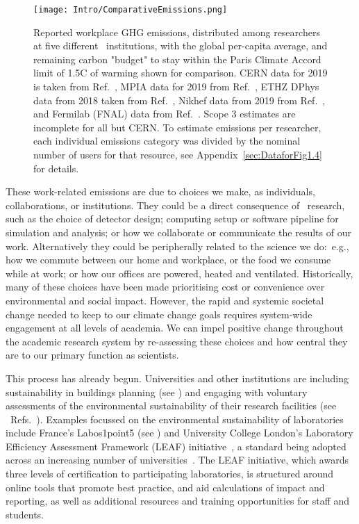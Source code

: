 \documentclass[../SustainableHEP.tex]{subfiles}
\begin{document}
\begin{figure}[!tb]
    \centering
    \texttt{[image: Intro/ComparativeEmissions.png]}
    \caption[Reported workplace GHG emissions for researchers at \ACR\ institutions]{Reported workplace GHG emissions, distributed among researchers at five different \ACR\ institutions, with the global per-capita average, and remaining carbon "budget" to stay within the Paris Climate Accord limit of 1.5\degree C of warming shown for comparison.
    CERN data for 2019 is taken from Ref.~\cite{Environment:2737239,CERN-HR-STAFF-STAT-2019,CERN:2723123,Hartley}, MPIA data for 2019 from Ref.~\cite{Jahnke2020}, ETHZ DPhys data from 2018 taken from Ref.~\cite{Beisert2020}, Nikhef data from 2019 from Ref.~\cite{Nikhef}, and Fermilab (FNAL) data from Ref.~\cite{FermilabEnvReport2019}. Scope 3 estimates are incomplete for all but CERN.  To estimate emissions per researcher, each individual emissions category was divided by the nominal number of users for that resource, see Appendix~\ref{sec:DataforFig1.4} for details.  
    \label{fig:Intro-ComparativeEmissions}}
\end{figure}

These work-related emissions are due to choices we make, as individuals, collaborations, or institutions.  They could be a direct consequence of \ACR\ research, such as the choice of detector design; computing setup or software pipeline for simulation and analysis; or how we collaborate or communicate the results of our work.  Alternatively they could be peripherally related to the science we do:~e.g., how we commute between our home and workplace, or the food we consume while at work; or how our offices are powered, heated and ventilated. 
Historically, many of these choices have been made prioritising cost or convenience over environmental and social impact.  However, the rapid and systemic societal change needed to keep to our climate change goals requires system-wide engagement at all levels of academia.  We can impel positive change throughout the academic research system by re-assessing these choices and how central they are to our primary function as scientists.

This process has already begun. Universities and other institutions are including sustainability in buildings planning (see ) and engaging with voluntary assessments of the environmental sustainability of their research facilities (see \eg~Refs.~\cite{Environment:2737239, Jahnke2020, Beisert2020, Nikhef, FermilabEnvReport2019}). Examples focussed on the environmental sustainability of laboratories include France's Labos1point5 (see ) and University College London’s Laboratory Efficiency Assessment Framework (LEAF) initiative~\cite{LEAF_framework, LEAF_take_part}, a standard being adopted across an increasing number of universities~\cite{LEAF_impact}. The LEAF initiative, which awards three levels of certification to participating laboratories, is structured around online tools that promote best practice, and aid calculations of impact and reporting, as well as additional resources and training opportunities for staff and students. 
\end{document}
